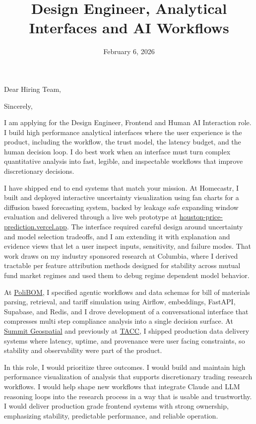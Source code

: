 \documentclass[letterpaper, 10pt,colorlinks,linkcolor=cyan]{moderncv}
\title{\large Design Engineer, Analytical Interfaces and AI Workflows}
\begin{document}
  \hypersetup{urlcolor=links}
  \makecvtitle

  \date{February 6, 2026}
  \opening{Dear Hiring Team,}
  \closing{Sincerely,}
  \makelettertitle

I am applying for the Design Engineer, Frontend and Human AI Interaction role. I build high performance analytical interfaces where the user experience is the product, including the workflow, the trust model, the latency budget, and the human decision loop. I do best work when an interface must turn complex quantitative analysis into fast, legible, and inspectable workflows that improve discretionary decisions.

I have shipped end to end systems that match your mission. At Homecastr, I built and deployed interactive uncertainty visualization using fan charts for a diffusion based forecasting system, backed by leakage safe expanding window evaluation and delivered through a live web prototype at \href{https://houston-price-prediction.vercel.app}{houston-price-prediction.vercel.app}. The interface required careful design around uncertainty and model selection tradeoffs, and I am extending it with explanation and evidence views that let a user inspect inputs, sensitivity, and failure modes. That work draws on my industry sponsored research at Columbia, where I derived tractable per feature attribution methods designed for stability across mutual fund market regimes and used them to debug regime dependent model behavior.

At \href{https://polibom.com}{PoliBOM}, I specified agentic workflows and data schemas for bill of materials parsing, retrieval, and tariff simulation using Airflow, embeddings, FastAPI, Supabase, and Redis, and I drove development of a conversational interface that compresses multi step compliance analysis into a single decision surface. At \href{https://summitgeospatial.com}{Summit Geospatial} and previously at \href{https://tacc.utexas.edu}{TACC}, I shipped production data delivery systems where latency, uptime, and provenance were user facing constraints, so stability and observability were part of the product.

In this role, I would prioritize three outcomes. I would build and maintain high performance visualization of analysis that supports discretionary trading research workflows. I would help shape new workflows that integrate Claude and LLM reasoning loops into the research process in a way that is usable and trustworthy. I would deliver production grade frontend systems with strong ownership, emphasizing stability, predictable performance, and reliable operation.
\end{document}

